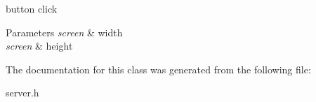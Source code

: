 button click 


\begin{DoxyParams}{Parameters}
{\em screen} & width \\
\hline
{\em screen} & height \\
\hline
\end{DoxyParams}


The documentation for this class was generated from the following file\-:\begin{DoxyCompactItemize}
\item 
server.\-h\end{DoxyCompactItemize}
